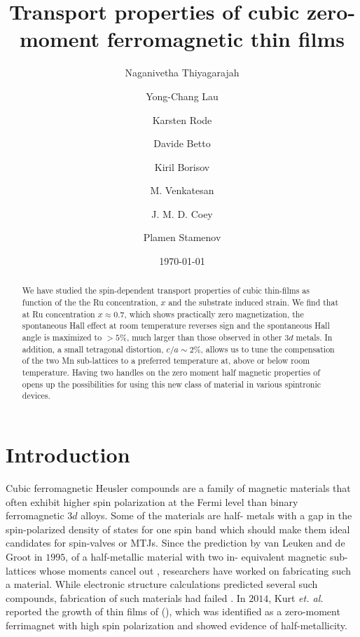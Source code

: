 \documentclass[reprint,aip,apl,floatfix,linenumbers,superscriptaddress]{revtex4-1}
\begin{document}
\title{Transport properties of cubic zero-moment ferromagnetic  thin films}
\author{Naganivetha Thiyagarajah}
\author{Yong-Chang Lau}
\author{Karsten Rode}
\author{Davide Betto}
\author{Kiril Borisov}
\author{M. Venkatesan}
\author{J. M. D. Coey}
\author{Plamen Stamenov}

\date{\today}

\begin{abstract}
We have studied the spin-dependent transport properties of cubic  thin-films as function of the the Ru concentration, $x$ and the substrate 
induced strain. We find that at Ru concentration $x\approx\num{0.7}$, which 
shows practically zero magnetization, the spontaneous Hall effect at room 
temperature reverses sign and the spontaneous Hall angle is maximized to $>5\%
$, much larger than those observed in other $3d$ metals. In addition, a small 
tetragonal distortion, $c/a\sim\num{2}\%$, allows us to tune the compensation 
of the two Mn sub-lattices to a preferred temperature at, above or below room 
temperature. Having two handles on the zero moment half magnetic properties 
of  opens up the possibilities for using this new class of 
material in various spintronic devices. 


\end{abstract}
\maketitle

\section{Introduction}
\label{sec:intro}

Cubic ferromagnetic Heusler compounds are a family of magnetic materials that 
often exhibit higher spin polarization at the Fermi level than binary 
ferromagnetic $3d$ alloys\cite{Graf2013}. Some of the materials are half-
metals with a gap in the spin-polarized density of states for one spin band 
which should make them ideal candidates for spin-valves or MTJs\cite{PhysRevB.
28.1745,Wang2009,Takahashi2011,Tsunegi2008}.  Since the prediction by van 
Leuken and de Groot in $1995$, of a half-metallic material with two in-
equivalent magnetic sub-lattices whose moments cancel out \cite{PhysRevLett.50
.2024}, researchers have worked on fabricating such a material. While 
electronic structure calculations predicted several such compounds\cite{
Wurmehl2006, Hu2012, Galanakis2006}, fabrication of such materials had failed
\cite{Hu2012,PhysRevB.79.100406}. In $2014$, Kurt \textit{et. al.} reported 
the growth of thin films of  (), which was identified 
as a zero-moment ferrimagnet with high spin polarization and showed evidence 
of half-metallicity\cite{KurtPRL2014}. 
\end{document}
